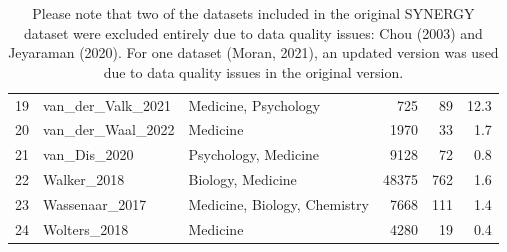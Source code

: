 \documentclass[12pt]{article}
\begin{document}
\begin{table}[ht]
\begin{tabularx}{\textwidth}{@{}r l X r r r@{}}
19 & van\_der\_Valk\_2021      & Medicine, Psychology & 725   & 89  & 12.3 \\
20 & van\_der\_Waal\_2022      & Medicine & 1970  & 33  & 1.7 \\
21 & van\_Dis\_2020            & Psychology, Medicine & 9128  & 72  & 0.8 \\
22 & Walker\_2018              & Biology, Medicine & 48375 & 762 & 1.6 \\
23 & Wassenaar\_2017           & Medicine, Biology, Chemistry & 7668  & 111 & 1.4 \\
24 & Wolters\_2018             & Medicine & 4280  & 19  & 0.4 \\
\bottomrule
\end{tabularx}
\caption{Please note that two of the datasets included in the original SYNERGY dataset were excluded entirely due to data quality issues: Chou (2003) and Jeyaraman (2020). For one dataset (Moran, 2021), an updated version was used due to data quality issues in the original version.}
\end{table}
\label{tab:SYNERGY}




\end{document}
